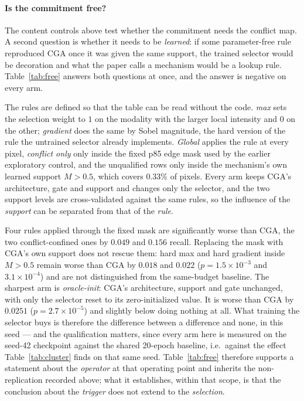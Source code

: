 \documentclass[pdflatex,sn-mathphys-num]{sn-jnl}
\theoremstyle{thmstyleone}%
\theoremstyle{thmstyletwo}%
\theoremstyle{thmstylethree}%
\begin{document}
\paragraph{Is the commitment free?}
The content controls above test whether the commitment needs the conflict map. A second question is whether it needs to be \emph{learned}: if some parameter-free rule reproduced CGA once it was given the same support, the trained selector would be decoration and what the paper calls a mechanism would be a lookup rule. Table~\ref{tab:free} answers both questions at once, and the answer is negative on every arm.

The rules are defined so that the table can be read without the code. \emph{max} sets the selection weight to $1$ on the modality with the larger local intensity and $0$ on the other; \emph{gradient} does the same by Sobel magnitude, the hard version of the rule the untrained selector already implements. \emph{Global} applies the rule at every pixel, \emph{conflict only} only inside the fixed p85 edge mask used by the earlier exploratory control, and the unqualified rows only inside the mechanism's own learned support $M > 0.5$, which covers $0.33\%$ of pixels. Every arm keeps CGA's architecture, gate and support and changes only the selector, and the two support levels are cross-validated against the same rules, so the influence of the \emph{support} can be separated from that of the \emph{rule}.

Four rules applied through the fixed mask are significantly worse than CGA, the two conflict-confined ones by $0.049$ and $0.156$ recall. Replacing the mask with CGA's own support does not rescue them: hard max and hard gradient inside $M > 0.5$ remain worse than CGA by $0.018$ and $0.022$ ($p = 1.5\times10^{-3}$ and $3.1\times10^{-4}$) and are not distinguished from the same-budget baseline. The sharpest arm is \emph{oracle-init}: CGA's architecture, support and gate unchanged, with only the selector reset to its zero-initialized value. It is worse than CGA by $0.0251$ ($p = 2.7\times10^{-5}$) and slightly below doing nothing at all. What training the selector buys is therefore the difference between a difference and none, in this seed --- and the qualification matters, since every arm here is measured on the seed-42 checkpoint against the shared 20-epoch baseline, i.e.\ against the effect Table~\ref{tab:cluster} finds on that same seed. Table~\ref{tab:free} therefore supports a statement about the \emph{operator} at that operating point and inherits the non-replication recorded above; what it establishes, within that scope, is that the conclusion about the \emph{trigger} does not extend to the \emph{selection}.
\end{document}
